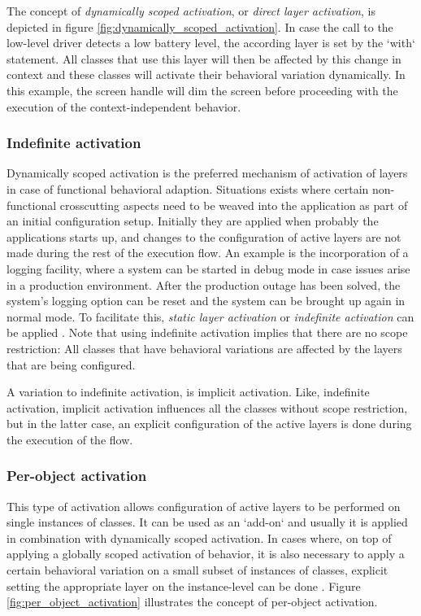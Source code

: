 \documentclass{acm_proc_article-sp}
\begin{document}
The concept of \textit{dynamically scoped activation}, or \textit{direct layer activation}, is depicted in figure \ref{fig:dynamically_scoped_activation}. In case the call to the low-level driver detects a low battery level, the according layer is set by the `with` statement. All classes that use this layer will then be affected by this change in context and these classes will activate their behavioral variation dynamically. In this example, the screen handle will dim the screen before proceeding with the execution of the context-independent behavior.

\subsubsection{Indefinite activation}
\label{indefinite_activation}
Dynamically scoped activation is the preferred mechanism of activation of layers in case of functional behavioral adaption. Situations exists where certain non-functional crosscutting aspects need to be weaved into the application as part of an initial configuration setup. Initially they are applied when probably the applications starts up, and changes to the configuration of active layers are not made during the rest of the execution flow. An example is the incorporation of a logging facility, where a system can be started in debug mode in case issues arise in a production environment. After the production outage has been solved, the system's logging option can be reset and the system can be brought up again in normal mode. To facilitate this, \textit{static layer activation} or \textit{indefinite activation} can be applied  \cite{SALVANESCHI20121801}. Note that using indefinite activation implies that there are no scope restriction: All classes that have behavioral variations are affected by the layers that are being configured. 

A variation to indefinite activation, is implicit activation. Like, indefinite activation, implicit activation influences all the classes without scope restriction, but in the latter case, an explicit configuration of the active layers is done during the execution of the flow. 

\subsubsection{Per-object activation}
\label{per_object_activation}
This type of activation allows configuration of active layers to be performed on single instances of classes. It can be used as an `add-on` and usually it is applied in combination with dynamically scoped activation. In cases where, on top of applying a  globally scoped activation of behavior, it is also necessary to apply a certain behavioral variation on a small subset of instances of classes, explicit setting the appropriate layer on the instance-level can be done \cite{SALVANESCHI20121801}. Figure \ref{fig:per_object_activation} illustrates the concept of per-object activation.
\end{document}
